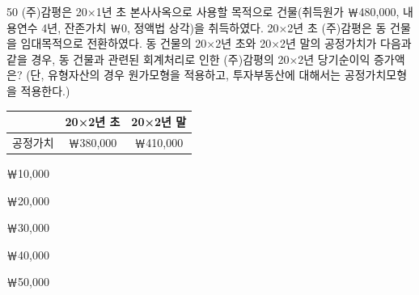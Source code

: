 \begin{question}{50}
(주)감평은 20×1년 초 본사사옥으로 사용할 목적으로 건물(취득원가 ￦480,000, 내용연수 4년, 잔존가치 ￦0, 정액법 상각)을 취득하였다. 20×2년 초 (주)감평은 동 건물을 임대목적으로 전환하였다. 동 건물의 20×2년 초와 20×2년 말의 공정가치가 다음과 같을 경우, 동 건물과 관련된 회계처리로 인한 (주)감평의 20×2년 당기순이익 증가액은? (단, 유형자산의 경우 원가모형을 적용하고, 투자부동산에 대해서는 공정가치모형을 적용한다.)
\par{\small\centering
\begin{tabular}{|c|c|c|}\hline
 & 20×2년 초 & 20×2년 말 \\ \hline
공정가치 & ￦380,000 & ￦410,000 \\ \hline
\end{tabular}
\par}
\begin{choices}
  \item ￦10,000
  \item ￦20,000
  \item ￦30,000
  \item ￦40,000
  \item ￦50,000
\end{choices}
\end{question}
